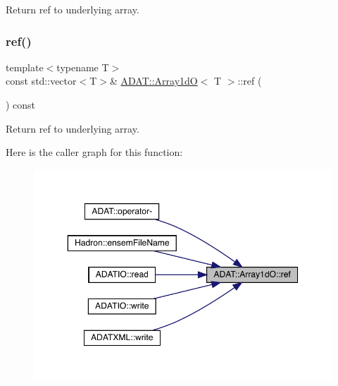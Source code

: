 Return ref to underlying array. 

\mbox{\label{classADAT_1_1Array1dO_a3b74880db3b0d48e29fb28f80a283352}} 
\subsubsection{\texorpdfstring{ref()}{ref()}\hspace{0.1cm}{\footnotesize\ttfamily [2/6]}}
{\footnotesize\ttfamily template$<$typename T$>$ \\
const std\+::vector$<$T$>$\& \mbox{\hyperlink{classADAT_1_1Array1dO}{A\+D\+A\+T\+::\+Array1dO}}$<$ T $>$\+::ref (\begin{DoxyParamCaption}{ }\end{DoxyParamCaption}) const\hspace{0.3cm}{\ttfamily [inline]}}



Return ref to underlying array. 

Here is the caller graph for this function\+:
\nopagebreak
\begin{figure}[H]
\begin{center}
\leavevmode
\includegraphics[width=350pt]{db/d5c/classADAT_1_1Array1dO_a3b74880db3b0d48e29fb28f80a283352_icgraph}
\end{center}
\end{figure}
\mbox{\label{classADAT_1_1Array1dO_a3b74880db3b0d48e29fb28f80a283352}} 
